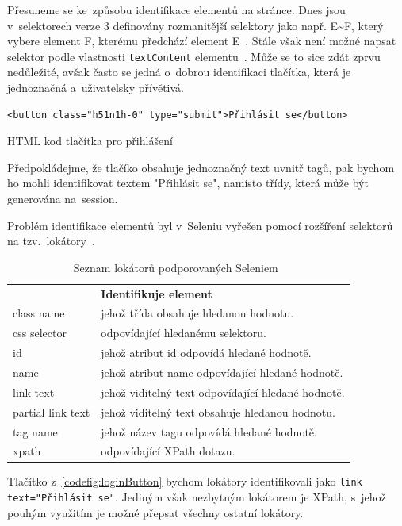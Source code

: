 \documentclass[12pt, a4paper, twoside]{article}
\newcommand{\codefigureSpacing}{1.2}
\begin{document}
	\noindent Přesuneme se ke~způsobu identifikace elementů na stránce. Dnes jsou v~selektorech verze 3 definovány rozmanitější selektory jako např. E\textasciitilde F, který vybere element F, kterému předchází element E~\cite{selectors3W3c}. Stále však není možné napsat selektor podle vlastnosti \texttt{textContent} elementu~\cite{selectors4W3c}. Může se to sice zdát zprvu nedůležité, avšak často se jedná o~dobrou identifikaci tlačítka, která je jednoznačná a~uživatelsky přívětivá.
	\begin{codefigure}[H]
		\renewcommand\baselinestretch{\codefigureSpacing}
		\begin{lstlisting}[style=MyHTML]
<button class="h51n1h-0" type="submit">Přihlásit se</button>
		\end{lstlisting}
		\caption{HTML kod tlačítka pro přihlášení}
		\label{codefig:loginButton}
	\end{codefigure}
	Předpokládejme, že tlačíko obsahuje jednoznačný text uvnitř tagů, pak bychom ho mohli identifikovat textem "Přihlásit se", namísto třídy, která může být generována na~session.
	
	\newpage
	Problém identifikace elementů byl v~Seleniu vyřešen pomocí rozšíření selektorů na tzv.~lokátory~\cite{seleniumDocs}.
	{
	\begin{table}[H]
		\centering
	\begin{tabular}{ l|l }
	\rowcolor{tableHeadingBackground} \multicolumn{1}{l}{\textbf{Lokátor}} & \multicolumn{1}{l}{\textbf{Identifikuje element}} \\
	class name &  jehož třída obsahuje hledanou hodnotu.\\ 
	css selector & odpovídající hledanému selektoru. \\ 
	id & jehož atribut id odpovídá hledané hodnotě. \\
	name & jehož atribut name odpovídající hledané hodnotě. \\
	link text & jehož viditelný text odpovídající hledané hodnotě. \\
	partial link text & jehož viditelný text obsahuje hledanou hodnotu.  \\
	tag name & jehož název tagu odpovídá hledané hodnotě. \\
	xpath & odpovídající XPath dotazu. \\
	\end{tabular}
	\caption{Seznam lokátorů podporovaných Seleniem~\cite{seleniumDocs}}
	\label{tab:locatorsList}
	\end{table}
	}
	Tlačítko z~\cref{codefig:loginButton} bychom lokátory identifikovali jako \texttt{link text="Přihlásit se"}. Jediným však nezbytným lokátorem je XPath, s~jehož pouhým využitím je možné přepsat všechny ostatní lokátory.
\end{document}
